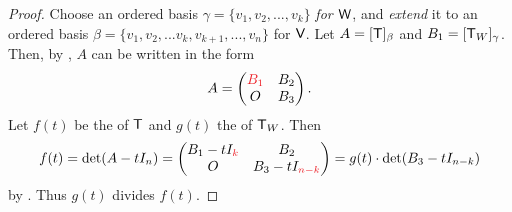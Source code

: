 \begin{proof}
Choose an ordered basis \(\gamma = \{ v_1, v_2, ..., v_k \}\) \emph{for \(\textsf{W}\)}, and \emph{extend} it to an ordered basis \(\beta = \{ v_1, v_2, ... v_k, v_{k + 1}, ..., v_n \}\) for \(\textsf{V}\).
Let \(A = [\textsf{T}]_{\beta}\) and \(B_1 = [\textsf{T}_W]_{\gamma}\).
Then, by , \(A\) can be written in the form
\[
    A = \begin{pmatrix}
        \RED{B_1} & B_2 \\ O & B_3
    \end{pmatrix}.
\]
Let \(f(t)\) be the \CPOLY{} of \(\textsf{T}\) and \(g(t)\) the \CPOLY{} of \(\textsf{T}_W\).
Then
\[
    f(t) = \det(A - tI_n) = \begin{pmatrix} B_1 - t I_{\RED{k}} & B_2 \\ O & B_3 - t I_{\RED{n - k}} \end{pmatrix}
    = g(t) \cdot \det(B_3 - t I_{n - k})
\]
by .
Thus \(g(t)\) divides \(f(t)\).
\end{proof}

